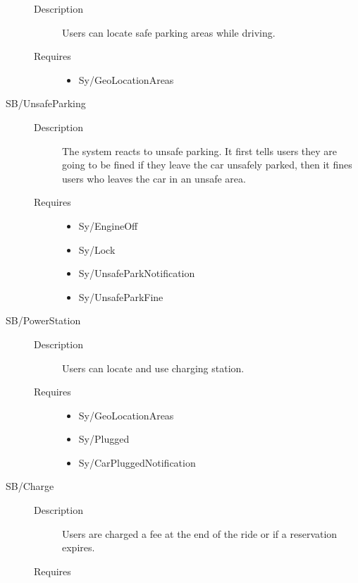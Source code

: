 \documentclass[11pt]{article} %
\begin{document}
\begin{description}
	\begin{description}
		\item[Description] Users can locate safe parking areas while driving.
		\item[Requires] \hfill
		\begin{itemize}
			\item Sy/GeoLocationAreas %
		\end{itemize}
	\end{description}
	\item[SB/UnsafeParking] \hfill
	\begin{description}
		\item[Description] The system reacts to unsafe parking. It first tells users they are going to be fined if they leave the car unsafely parked, then it fines users who leaves the car in an unsafe area.
		\item[Requires] \hfill
		\begin{itemize}
			\item Sy/EngineOff %
			\item Sy/Lock %
			\item Sy/UnsafeParkNotification %
			\item Sy/UnsafeParkFine
		\end{itemize}
	\end{description}
	\item[SB/PowerStation] \hfill
	\begin{description}
		\item[Description] Users can locate and use charging station.
		\item[Requires] \hfill
		\begin{itemize}
			\item Sy/GeoLocationAreas %
			\item Sy/Plugged %
			\item Sy/CarPluggedNotification %
		\end{itemize}
	\end{description}
	\item[SB/Charge] \hfill
	\begin{description}
		\item[Description] Users are charged a fee at the end of the ride or if a reservation expires.
		\item[Requires] \hfill

\end{description}
\end{description}
\end{document}
